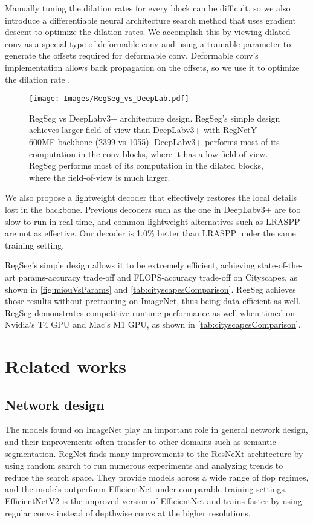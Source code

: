 \documentclass[10pt,twocolumn,letterpaper]{article}
\begin{document}
Manually tuning the dilation rates for every block can be difficult, so we also introduce a differentiable neural architecture search method that uses gradient descent to optimize the dilation rates. We accomplish this by viewing dilated conv as a special type of deformable conv\cite{dai2017deformable} and using a trainable parameter  to generate the offsets required for deformable conv. Deformable conv's implementation allows back propagation on the offsets, so we use it to optimize the dilation rate .

\begin{figure}
  \centering
    \texttt{[image: Images/RegSeg\_vs\_DeepLab.pdf]}

   \caption{RegSeg vs DeepLabv3+ architecture design. RegSeg's simple design achieves larger field-of-view than DeepLabv3+ with RegNetY-600MF backbone (2399 vs 1055). DeepLabv3+ performs most of its computation in the conv blocks, where it has a low field-of-view. RegSeg performs most of its computation in the dilated blocks, where the field-of-view is much larger.}
   \label{fig:regseg_vs_deeplab}
\end{figure}

We also propose a lightweight decoder that effectively restores the local details lost in the backbone. Previous decoders such as the one in DeepLabv3+\cite{deeplabv3plus2018} are too slow to run in real-time, and common lightweight alternatives such as LRASPP\cite{mobilenetv32019} are not as effective. Our decoder is 1.0\% better than LRASPP under the same training setting.

RegSeg's simple design allows it to be extremely efficient, achieving state-of-the-art params-accuracy trade-off and FLOPS-accuracy trade-off on Cityscapes\cite{cityscapes}, as shown in \cref{fig:miouVsParams} and \cref{tab:cityscapesComparison}. RegSeg achieves those results without pretraining on ImageNet\cite{deng2009imagenet}, thus being data-efficient as well. RegSeg demonstrates competitive runtime performance as well when timed on Nvidia's T4 GPU and Mac's M1 GPU, as shown in \cref{tab:cityscapesComparison}.



\section{Related works}
\subsection{Network design}
The models found on ImageNet play an important role in general network design, and their improvements often transfer to other domains such as semantic segmentation. RegNet\cite{regnet,regnetz} finds many improvements to the ResNeXt\cite{resnext} architecture by using random search to run numerous experiments and analyzing trends to reduce the search space. They provide models across a wide range of flop regimes, and the models outperform EfficientNet\cite{tan2019efficientnet} under comparable training settings. EfficientNetV2\cite{efficientnetv2} is the improved version of EfficientNet and trains faster by using regular convs instead of depthwise convs at the higher resolutions.
\end{document}
